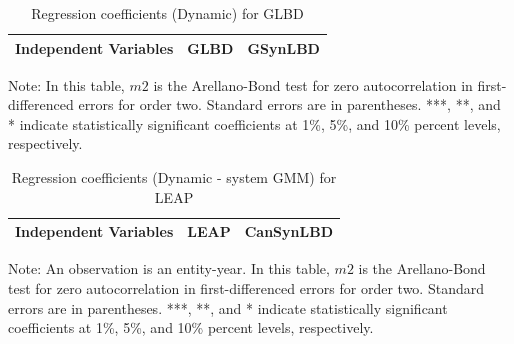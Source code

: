 \begin{table}[H]
  \centering
 \caption{Regression coefficients (Dynamic) for GLBD} \label{tab:Dynamic - GMM_ger} \medskip
\renewcommand{\arraystretch}{1}
\setlength{\tabcolsep}{13pt}
\begin{tabular}{l|c |c}
\toprule
\textbf{Independent Variables}&\textbf{GLBD} &\textbf{GSynLBD}\\
\midrule

   \bottomrule
  \end{tabular} 
\begin{tablenotes}
\small
\item Note: In this table, $m2$ is the Arellano-Bond test for zero autocorrelation in first-differenced errors for order two. Standard errors are in parentheses. ***, **, and * indicate statistically significant coefficients at 1\%, 5\%, and 10\% percent levels, respectively.
 \end{tablenotes}
\end{table}




\begin{table}[H]
  \centering
\begin{threeparttable}
 \caption{Regression coefficients (Dynamic - system GMM) for LEAP} \label{tab:Dynamic - system GMM_can} \medskip
\renewcommand{\arraystretch}{1}
\begin{tabular}{l|c c| c c}
\toprule
\textbf{Independent Variables}&\multicolumn{2}{c|}{\textbf{LEAP}} &  \multicolumn{2}{c}{\textbf{CanSynLBD}}\\
\midrule

   \bottomrule
  \end{tabular} 
\begin{tablenotes}
\small
\item Note: An observation is an entity-year. In this table, $m2$ is the Arellano-Bond test for zero autocorrelation in first-differenced errors for order two. Standard errors are in parentheses. ***, **, and * indicate statistically significant coefficients at 1\%, 5\%, and 10\% percent levels, respectively.
 \end{tablenotes}
 \end{threeparttable}
\end{table}


